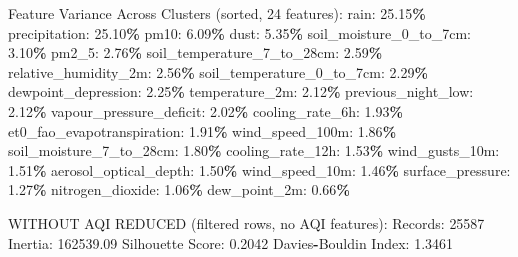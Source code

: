 \documentclass[
  letterpaper,
  DIV=11,
  numbers=noendperiod]{scrartcl}
\newenvironment{Shaded}{\begin{snugshade}}{\end{snugshade}}
\newcommand{\BuiltInTok}[1]{#1}
\newcommand{\DecValTok}[1]{\textcolor[rgb]{0.00,0.00,0.81}{#1}}
\newcommand{\FloatTok}[1]{\textcolor[rgb]{0.00,0.00,0.81}{#1}}
\newcommand{\NormalTok}[1]{#1}
\newcommand{\OperatorTok}[1]{\textcolor[rgb]{0.81,0.36,0.00}{\textbf{#1}}}
\begin{document}
\begin{Shaded}
\begin{Highlighting}[]
\NormalTok{  Feature Variance Across Clusters (}\BuiltInTok{sorted}\NormalTok{, }\DecValTok{24}\NormalTok{ features):}
\NormalTok{    rain: }\FloatTok{25.15}\OperatorTok{\%}
\NormalTok{    precipitation: }\FloatTok{25.10}\OperatorTok{\%}
\NormalTok{    pm10: }\FloatTok{6.09}\OperatorTok{\%}
\NormalTok{    dust: }\FloatTok{5.35}\OperatorTok{\%}
\NormalTok{    soil\_moisture\_0\_to\_7cm: }\FloatTok{3.10}\OperatorTok{\%}
\NormalTok{    pm2\_5: }\FloatTok{2.76}\OperatorTok{\%}
\NormalTok{    soil\_temperature\_7\_to\_28cm: }\FloatTok{2.59}\OperatorTok{\%}
\NormalTok{    relative\_humidity\_2m: }\FloatTok{2.56}\OperatorTok{\%}
\NormalTok{    soil\_temperature\_0\_to\_7cm: }\FloatTok{2.29}\OperatorTok{\%}
\NormalTok{    dewpoint\_depression: }\FloatTok{2.25}\OperatorTok{\%}
\NormalTok{    temperature\_2m: }\FloatTok{2.12}\OperatorTok{\%}
\NormalTok{    previous\_night\_low: }\FloatTok{2.12}\OperatorTok{\%}
\NormalTok{    vapour\_pressure\_deficit: }\FloatTok{2.02}\OperatorTok{\%}
\NormalTok{    cooling\_rate\_6h: }\FloatTok{1.93}\OperatorTok{\%}
\NormalTok{    et0\_fao\_evapotranspiration: }\FloatTok{1.91}\OperatorTok{\%}
\NormalTok{    wind\_speed\_100m: }\FloatTok{1.86}\OperatorTok{\%}
\NormalTok{    soil\_moisture\_7\_to\_28cm: }\FloatTok{1.80}\OperatorTok{\%}
\NormalTok{    cooling\_rate\_12h: }\FloatTok{1.53}\OperatorTok{\%}
\NormalTok{    wind\_gusts\_10m: }\FloatTok{1.51}\OperatorTok{\%}
\NormalTok{    aerosol\_optical\_depth: }\FloatTok{1.50}\OperatorTok{\%}
\NormalTok{    wind\_speed\_10m: }\FloatTok{1.46}\OperatorTok{\%}
\NormalTok{    surface\_pressure: }\FloatTok{1.27}\OperatorTok{\%}
\NormalTok{    nitrogen\_dioxide: }\FloatTok{1.06}\OperatorTok{\%}
\NormalTok{    dew\_point\_2m: }\FloatTok{0.66}\OperatorTok{\%}

\NormalTok{WITHOUT AQI REDUCED (filtered rows, no AQI features):}
\NormalTok{  Records: }\DecValTok{25587}
\NormalTok{  Inertia: }\FloatTok{162539.09}
\NormalTok{  Silhouette Score: }\FloatTok{0.2042}
\NormalTok{  Davies}\OperatorTok{{-}}\NormalTok{Bouldin Index: }\FloatTok{1.3461}


\end{Highlighting}
\end{Shaded}
\end{document}

